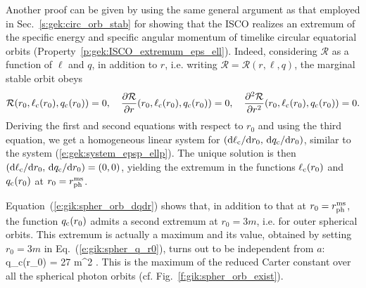\begin{remark}
Another proof can be given by using the same general argument as that employed in
Sec.~\ref{s:gek:circ_orb_stab}
for showing that the ISCO realizes an extremum of the specific energy
and specific angular momentum of timelike circular equatorial orbits
(Property~\ref{p:gek:ISCO_extremum_eps_ell}).
Indeed, considering $\mathcal{R}$ as a function of $\ell$ and $q$, in addition
to $r$, i.e. writing $\mathcal{R} = \mathcal{R}(r, \ell, q)$, the marginal
stable orbit obeys
\[
    \mathcal{R}(r_0, \ell_{\rm c}(r_0), q_{\rm c}(r_0)) = 0,\quad
    \frac{\partial \mathcal{R}}{\partial r}(r_0, \ell_{\rm c}(r_0), q_{\rm c}(r_0)) = 0,\quad
    \frac{\partial^2\mathcal{R}}{\partial r^2} (r_0, \ell_{\rm c}(r_0), q_{\rm c}(r_0)) = 0 .
\]
Deriving the first and second equations with respect to $r_0$
and using the third equation, we get a homogeneous linear
system for $(\mathrm{d}\ell_{\rm c}/\mathrm{d} r_0,\, \mathrm{d} q_{\rm c}/\mathrm{d} r_0)$, similar to the
system (\ref{e:gek:system_epsp_ellp}). The unique solution
is then $(\mathrm{d}\ell_{\rm c}/\mathrm{d} r_0,\, \mathrm{d} q_{\rm c}/\mathrm{d} r_0) = (0, 0)$, yielding the extremum in the
functions $\ell_{\rm c}(r_0)$ and $q_{\rm c}(r_0)$ at $r_0 = r_{\rm ph}^{\rm ms}$.
\end{remark}

Equation~(\ref{e:gik:spher_orb_dqdr}) shows that, in addition to that
at $r_0 = r_{\rm ph}^{\rm ms}$, the function $q_{\rm c}(r_0)$ admits
a second extremum at $r_0 = 3m$, i.e. for outer spherical orbits.
This extremum is actually a maximum and its value, obtained by
setting $r_0 = 3 m$ in Eq.~(\ref{e:gik:spher_q_r0}),
turns out to be independent from $a$:
\be \label{e:gik:spher_max_q}
    \max q_{\rm c}(r_0) = 27 m^2 .
\ee
This is the maximum of the reduced Carter constant over all the spherical photon
orbits (cf. Fig.~\ref{f:gik:spher_orb_exist}).


